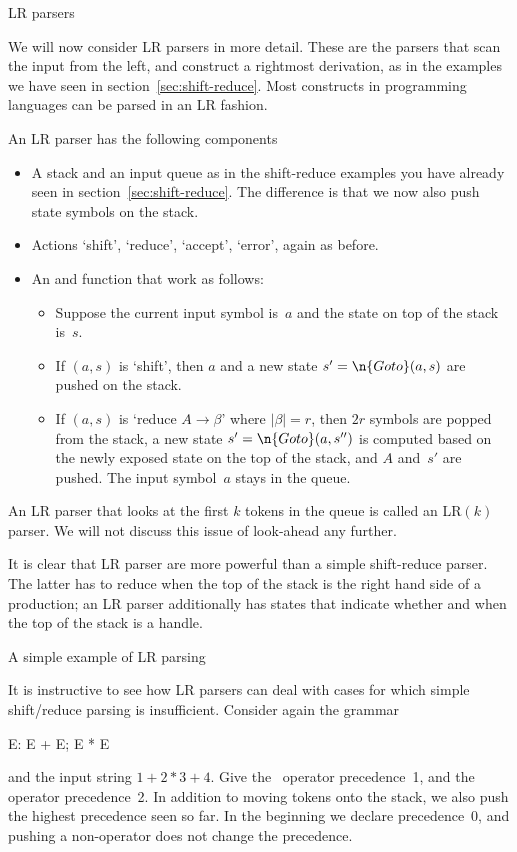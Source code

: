  {LR parsers}
\label{sec:LR}

We will now consider LR parsers in more detail.
These are the parsers that scan the input from the left, and construct
a rightmost derivation, as in the examples we have seen in
section~\ref{sec:shift-reduce}. Most constructs in programming
languages can be parsed in an LR fashion.

An LR parser has the following components
\begin{itemize}
\item A stack and an input queue as in the shift-reduce examples you
  have already seen in section~\ref{sec:shift-reduce}. The difference
  is that we now also push state symbols on the stack.
\item Actions `shift', `reduce', `accept', `error', again as before.
\item An  and  function that  work as follows:
\begin{itemize}
\item Suppose the current input symbol is~$a$ and the state on top of
  the stack is~$s$.
\item If $(a,s)$ is `shift', then $a$ and a new state
  $s'=\n{Goto}(a,s)$ are pushed on the stack.
\item If $(a,s)$ is `reduce $A\rightarrow\beta$' where
  $|\beta|=r$, then $2r$ symbols are popped from the stack, a new
  state $s'=\n{Goto}(a,s'')$ is computed based on the newly exposed
  state on the top of the stack, and $A$ and~$s'$ are pushed. The
  input symbol~$a$ stays in the queue.
\end{itemize}
\end{itemize}
An LR parser that looks at the first $k$ tokens in the queue
is called an LR$(k)$ parser. We will not discuss this issue of
look-ahead any further.

It is clear that LR parser are more powerful than a simple
shift-reduce parser. The latter has to reduce when the top of the
stack is the right hand side of a production; an LR parser
additionally has states that indicate whether and when the top of the
stack is a handle.

 {A simple example of LR parsing}

It is instructive to see how LR parsers can deal with cases for which
simple shift/reduce parsing is insufficient. Consider again the
grammar
\begin{bnf}
E: E + E; E * E
\end{bnf}
and the input string $1+2*3+4$. Give the~\n{+} operator precedence~1,
and the~\n{*} operator precedence~2. In addition to moving tokens onto
the stack, we also push the highest precedence seen so far. In the
beginning we declare precedence~0, and pushing a non-operator does not
change the precedence.

